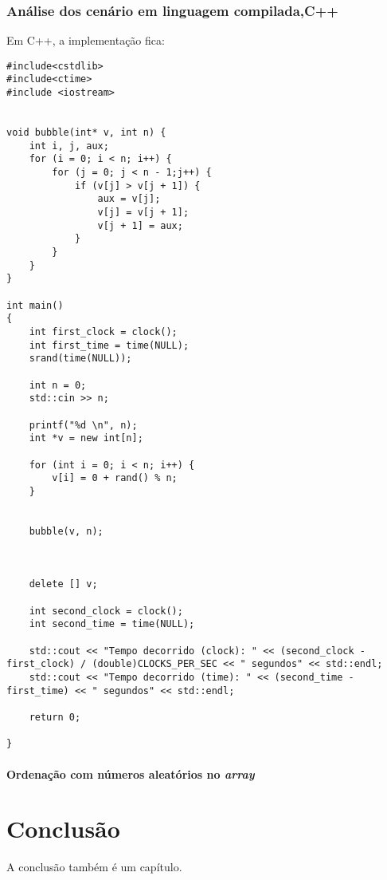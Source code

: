 \documentclass[tcc/ec]{faeng}
\begin{document}
\subsection{Análise dos cenário em linguagem compilada,C++}

Em C++, a implementação fica:

\begin{lstlisting}
#include<cstdlib>
#include<ctime>
#include <iostream>


void bubble(int* v, int n) {
	int i, j, aux;
	for (i = 0; i < n; i++) {
		for (j = 0; j < n - 1;j++) {
			if (v[j] > v[j + 1]) {
				aux = v[j];
				v[j] = v[j + 1];
				v[j + 1] = aux;
			}
		}
	}
}

int main()
{
	int first_clock = clock();
	int first_time = time(NULL);
	srand(time(NULL));
	
	int n = 0;
	std::cin >> n;

	printf("%d \n", n);
	int *v = new int[n];

	for (int i = 0; i < n; i++) {
		v[i] = 0 + rand() % n;
	}


	bubble(v, n);



	delete [] v;

	int second_clock = clock();
	int second_time = time(NULL);

	std::cout << "Tempo decorrido (clock): " << (second_clock - first_clock) / (double)CLOCKS_PER_SEC << " segundos" << std::endl;
	std::cout << "Tempo decorrido (time): " << (second_time - first_time) << " segundos" << std::endl;

	return 0;
		 
}
\end{lstlisting}

\subsubsection{Ordenação com números aleatórios no \textit{array}}

\chapter[Conclusão]{Conclusão}
A conclusão também é um capítulo.

\postextual
\end{document}
